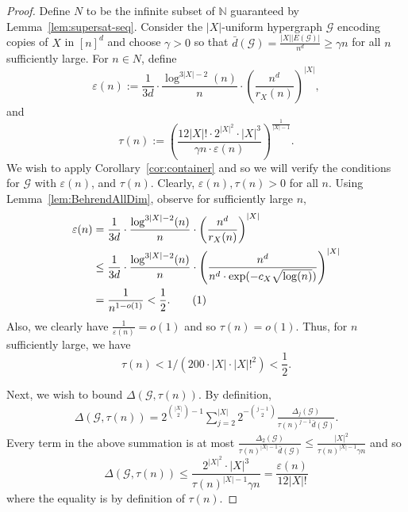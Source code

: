 \documentclass[12pt]{article}
\numberwithin{equation}{section}
\theoremstyle{definition}
\theoremstyle{remark}
\begin{document}
\begin{proof}
Define $N$ to be the infinite subset of $\mathbb{N}$ guaranteed by Lemma~\ref{lem:supersat-seq}. Consider the $|X|$-uniform hypergraph $\mathcal{G}$ encoding copies of $X$ in $[n]^d$ and choose $\gamma>0$ so that $\bar{d}(\mathcal{G})= \frac{|X||E(\mathcal{G})|}{n^d} \geq \gamma n$ for all $n$ sufficiently large. For $n\in N$, define 
\[\varepsilon(n) := \frac{1}{3d}\cdot\frac{\log^{3|X|-2}(n)}{n}\cdot\left(\frac{n^d}{r_X(n)}\right)^{|X|}, \]
and
\[\tau(n):=\left(\frac{12|X|!\cdot 2^{|X|^2}\cdot |X|^3}{\gamma n\cdot \varepsilon(n)}\right)^{\frac{1}{|X|-1}}.\]
We wish to apply Corollary~\ref{cor:container} and so we will verify the conditions for $\mathcal{G}$ with $\varepsilon(n)$, and $\tau(n)$. Clearly, $\varepsilon(n), \tau(n) > 0$ for all $n$. Using Lemma~\ref{lem:BehrendAllDim}, observe for sufficiently large $n$,
\begin{align*}
\varepsilon(n) &= \frac{1}{3d}\cdot\frac{\log^{3|X|-2}(n)}{n}\cdot\left(\frac{n^d}{r_X(n)}\right)^{|X|} \\
&\leq \frac{1}{3d}\cdot\frac{\log^{3|X|-2}(n)}{n}\cdot\left(\frac{n^d}{n^d\cdot\exp(-c_X\sqrt{\log(n)})}\right)^{|X|}\\
&= \frac{1}{n^{1-o(1)}} < \frac{1}{2}. \stepcounter{equation}\tag{\theequation}\label{eq:eps-small}
\end{align*}
Also, we clearly have $\frac{1}{\varepsilon(n)}=o(1)$ and so $\tau(n)=o(1)$. Thus, for $n$ sufficiently large, we have
\begin{equation}\label{eq:taucondition}
\tau(n) < 1/(200\cdot |X| \cdot |X|!^2) < \frac{1}{2}. 
\end{equation}

Next, we wish to bound $\Delta(\mathcal{G}, \tau(n))$. By definition,
\begin{align*}
\Delta(\mathcal{G}, \tau(n)) = 2^{\binom{|X|}{2} - 1} \sum_{j=2}^{|X|} 2^{-\binom{j-1}{2}} \frac{\Delta_j(\mathcal{G})}{\tau(n)^{j-1}\bar{d}(\mathcal{G})}.
\end{align*}
Every term in the above summation is at most $\frac{\Delta_2(\mathcal{G})}{\tau(n)^{|X|-1}\bar{d}(\mathcal{G})}\leq \frac{|X|^2}{\tau(n)^{|X|-1}\gamma n}$ and so
\begin{equation}\label{eq:codegreecondition}
\Delta(\mathcal{G},\tau(n)) \leq  \frac{2^{|X|^2}\cdot |X|^3}{\tau(n)^{|X|-1}\gamma n} = \frac{\varepsilon(n)}{12|X|!}\end{equation}
where the equality is by definition of $\tau(n)$. 



\end{proof}
\end{document}
